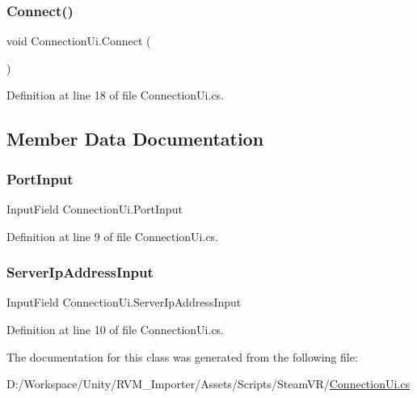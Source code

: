 \subsubsection{\texorpdfstring{Connect()}{Connect()}}
{\footnotesize\ttfamily void Connection\+Ui.\+Connect (\begin{DoxyParamCaption}{ }\end{DoxyParamCaption})}



Definition at line 18 of file Connection\+Ui.\+cs.



\subsection{Member Data Documentation}
\mbox{\label{class_connection_ui_aed563c13ba5341487b65764173a7523b}} 
\subsubsection{\texorpdfstring{PortInput}{PortInput}}
{\footnotesize\ttfamily Input\+Field Connection\+Ui.\+Port\+Input}



Definition at line 9 of file Connection\+Ui.\+cs.

\mbox{\label{class_connection_ui_a8b5ff35ab29a4964a0414ce73eca4cd7}} 
\subsubsection{\texorpdfstring{ServerIpAddressInput}{ServerIpAddressInput}}
{\footnotesize\ttfamily Input\+Field Connection\+Ui.\+Server\+Ip\+Address\+Input}



Definition at line 10 of file Connection\+Ui.\+cs.



The documentation for this class was generated from the following file\+:\begin{DoxyCompactItemize}
\item 
D\+:/\+Workspace/\+Unity/\+R\+V\+M\+\_\+\+Importer/\+Assets/\+Scripts/\+Steam\+V\+R/\mbox{\hyperlink{_connection_ui_8cs}{Connection\+Ui.\+cs}}\end{DoxyCompactItemize}

